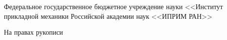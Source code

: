 \thispagestyle{empty}
\begin{center}
Федеральное государственное бюджетное учреждение науки <<Институт прикладной механики Российской академии наук <<ИПРИМ РАН>>
\end{center}
%
\vspace{0pt plus4fill} %
\begin{flushright}
	На правах рукописи
	
\end{flushright}